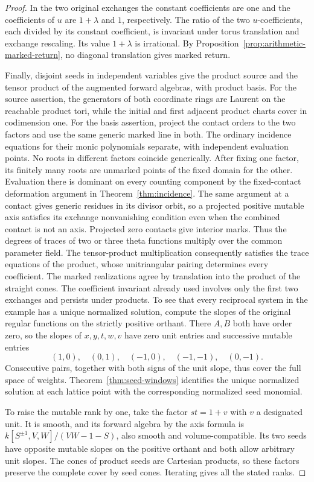 \documentclass[11pt,reqno]{amsart}
\numberwithin{equation}{section}
\theoremstyle{definition}
\theoremstyle{remark}
\begin{document}
\begin{proof}
In the two original exchanges the constant coefficients are one and
the coefficients of \(u\) are \(1+\lambda\) and \(1\), respectively.
The ratio of the two \(u\)-coefficients, each divided by its constant
coefficient, is invariant under torus translation and exchange
rescaling. Its value \(1+\lambda\) is irrational. By
Proposition~\ref{prop:arithmetic-marked-return}, no diagonal
translation gives marked return.

Finally, disjoint seeds in independent variables give the product
source and the tensor product of the augmented forward algebras,
with product basis. For the source assertion, the generators of both
coordinate rings are Laurent on the reachable product tori, while
the initial and first adjacent product charts cover in codimension
one. For the basis assertion, project the contact orders to the
two factors and use the same generic marked line in both. The
ordinary incidence equations for their monic polynomials separate,
with independent evaluation points. No roots in different factors
coincide generically. After fixing one factor, its finitely many
roots are unmarked points of the fixed domain for the other. Evaluation
there is dominant on every counting component by the fixed-contact
deformation argument in Theorem~\ref{thm:incidence}. The same
argument at a contact gives generic residues in its divisor orbit,
so a projected positive mutable axis satisfies its exchange
nonvanishing condition even when the combined contact is not an
axis. Projected zero contacts give interior marks. Thus the
degrees of traces of two or three theta functions multiply over the
common parameter field. The tensor-product multiplication consequently
satisfies the trace equations of the product, whose unitriangular
pairing determines every coefficient. The marked realizations agree
by translation into the product of the straight cones.
The coefficient invariant already used involves only the first two
exchanges and persists under products. To see that every reciprocal
system in the example has a unique normalized solution, compute the
slopes of the original regular functions on the strictly positive
orthant. There \(A,B\) both have order zero, so the slopes of
\(x,y,t,w,v\) have zero unit entries and successive mutable entries
\[ (1,0),\quad(0,1),\quad(-1,0),\quad(-1,-1),\quad(0,-1). \]
Consecutive pairs, together with both signs of the unit slope, thus
cover the full space of weights. Theorem~\ref{thm:seed-windows}
identifies the unique normalized solution at each lattice point with
the corresponding normalized seed monomial.

To raise the mutable rank
by one, take the factor \(st=1+v\) with \(v\) a designated unit.
It is smooth, and its forward algebra by the axis formula is
\(k[S^{\pm1},V,W]/(VW-1-S)\), also smooth and volume-compatible.
Its two seeds have opposite mutable slopes on the positive orthant
and both allow arbitrary unit slopes. The cones of product seeds
are Cartesian products, so these factors preserve the complete
cover by seed cones. Iterating gives all the stated ranks.
\end{proof}
\end{document}
